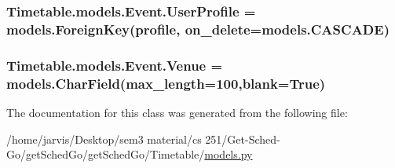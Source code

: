 \subsubsection[{\texorpdfstring{User\+Profile}{UserProfile}}]{\setlength{\rightskip}{0pt plus 5cm}Timetable.\+models.\+Event.\+User\+Profile = models.\+Foreign\+Key({\bf profile}, on\+\_\+delete=models.\+C\+A\+S\+C\+A\+DE)\hspace{0.3cm}{\ttfamily [static]}}\hypertarget{classTimetable_1_1models_1_1Event_a9a15a1f3ee137c8722f92920b00229bc}{}\label{classTimetable_1_1models_1_1Event_a9a15a1f3ee137c8722f92920b00229bc}
\subsubsection[{\texorpdfstring{Venue}{Venue}}]{\setlength{\rightskip}{0pt plus 5cm}Timetable.\+models.\+Event.\+Venue = models.\+Char\+Field(max\+\_\+length=100,blank=True)\hspace{0.3cm}{\ttfamily [static]}}\hypertarget{classTimetable_1_1models_1_1Event_a65d9ca29ba1e1b6675db649211e3f3aa}{}\label{classTimetable_1_1models_1_1Event_a65d9ca29ba1e1b6675db649211e3f3aa}


The documentation for this class was generated from the following file\+:\begin{DoxyCompactItemize}
\item 
/home/jarvis/\+Desktop/sem3 material/cs 251/\+Get-\/\+Sched-\/\+Go/get\+Sched\+Go/get\+Sched\+Go/\+Timetable/\hyperlink{Timetable_2models_8py}{models.\+py}\end{DoxyCompactItemize}
